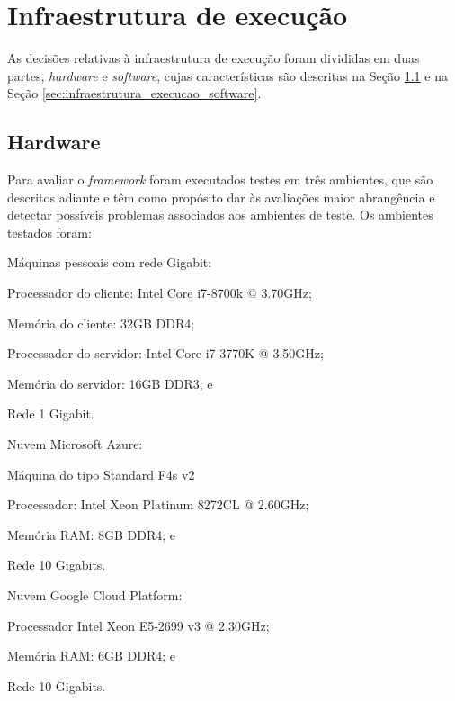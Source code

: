 \section{Infraestrutura de execução}
\label{sec:infraestrutura_execucao}

As decisões relativas à infraestrutura de execução foram divididas em duas partes, \textit{hardware} e \textit{software}, cujas características são descritas na Seção \ref{sec:infraestrutura_execucao_hardware} e na Seção \ref{sec:infraestrutura_execucao_software}.

\subsection{Hardware}
\label{sec:infraestrutura_execucao_hardware}

Para avaliar o \textit{framework} foram executados testes em três ambientes, que são descritos adiante e têm como propósito dar às avaliações maior abrangência e detectar possíveis problemas associados aos ambientes de teste. Os ambientes testados foram:

\begin{alineas}
	\item Máquinas pessoais com rede Gigabit:
	\begin{subalineas}
		\item Processador do cliente: Intel Core i7-8700k @ 3.70GHz;
		\item Memória do cliente: 32GB DDR4;
		\item Processador do servidor: Intel Core i7-3770K @ 3.50GHz;
		\item Memória do servidor: 16GB DDR3; e
		\item Rede 1 Gigabit.
	\end{subalineas}
	\item Nuvem Microsoft Azure:
	\begin{incisos}
	    \item Máquina do tipo Standard F4s v2
		\item Processador: Intel Xeon Platinum 8272CL @ 2.60GHz;
		\item Memória RAM: 8GB DDR4; e
		\item Rede 10 Gigabits. 
	\end{incisos}
	\item Nuvem Google Cloud Platform:
	\begin{alineas}
		\item Processador Intel Xeon E5-2699 v3 @ 2.30GHz;
		\item Memória RAM: 6GB DDR4; e
		\item Rede 10 Gigabits.
	\end{alineas}
\end{alineas}

